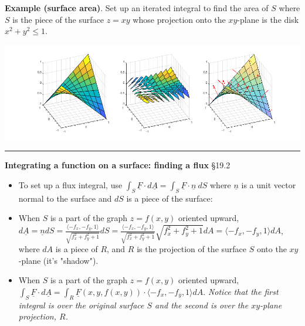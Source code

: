 \documentclass[12pt,letterpaper,noanswers]{exam}
\newcommand{\mb}[1]{\underline{#1}}
\begin{document}
\noindent\textbf{Example (surface area)}.  Set up an iterated integral to find the area of $S$ where $S$ is the piece of the surface $z = xy$ whose projection onto the $xy$-plane is the disk $x^2+y^2\leq 1$.

\includegraphics[width=1\linewidth]{img/C30p5-18.png}




\vspace{1.5in}
\eject

\vspace{0.2cm}
\hrule
\vspace{0.2cm}

\noindent\textbf{Integrating a function on a surface: finding a flux} \S 19.2
\begin{tcolorbox}
\begin{itemize}
\itemsep0em
    \item To set up a flux integral, use $\displaystyle \int_S \mb F\cdot d\mb A = \int_S \mb F \cdot \mb n\ dS$ where $\mb n$ is a unit vector normal to the surface and $dS$ is a piece of the surface:
    \item When $S$ is a part of the graph $z = f(x,y)$ oriented upward, $\displaystyle d\mb A = \mb n dS = \frac{\langle -f_x, -f_y,1\rangle}{\sqrt{f_x^2+f_y^2+1}} dS = \frac{\langle -f_x, -f_y,1\rangle}{\sqrt{f_x^2+f_y^2+1}}\sqrt{f_x^2+f_y^2+1} dA = \langle -f_x, -f_y,1\rangle dA$, where $dA$ is a piece of $R$, and $R$ is the projection of the surface $S$ onto the $xy$-plane (it's "shadow").  \item When $S$ is a part of the graph $z = f(x,y)$ oriented upward, $\displaystyle \int_S \mb F\cdot d\mb A = \int_R \mb F(x,y,f(x,y))\cdot \langle -f_x, -f_y, 1\rangle dA$.  \emph{Notice that the first integral is over the original surface $S$ and the second is over the $xy$-plane projection, $R$.}
\end{itemize}


\end{tcolorbox}
\end{document}
